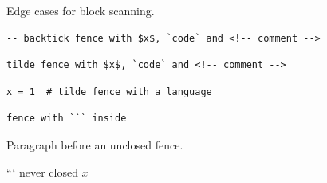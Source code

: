 \begin{frame}[t,fragile]
Edge cases for block scanning.

\begin{verbatim}
-- backtick fence with $x$, `code` and <!-- comment -->
\end{verbatim}

\begin{verbatim}
tilde fence with $x$, `code` and <!-- comment -->
\end{verbatim}

\begin{verbatim}
x = 1  # tilde fence with a language
\end{verbatim}

\begin{verbatim}
fence with ``` inside
\end{verbatim}

Paragraph before an unclosed fence.

```
never closed $x$ %

\end{frame}

